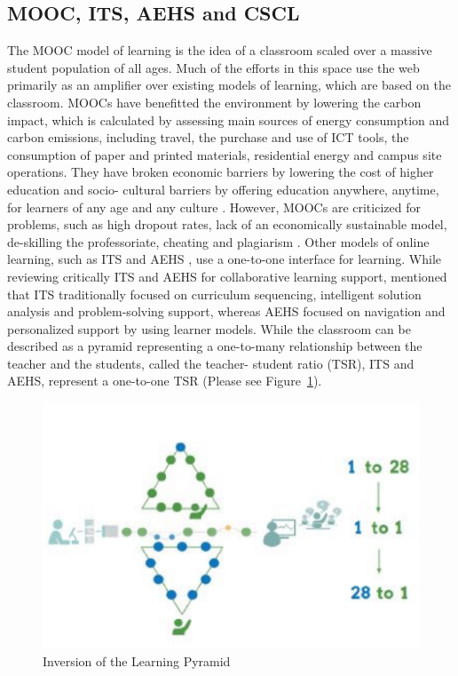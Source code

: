 \begin{multicols}{2}
\section{MOOC, ITS, AEHS and CSCL}

The MOOC model of learning is the idea of a classroom scaled over a massive student population of all ages. Much of the efforts in this space use the web primarily as an amplifier over existing models of learning, which are based on the classroom. MOOCs have benefitted the environment by lowering the carbon impact, which is calculated by assessing main sources of energy consumption and carbon emissions, including travel, the purchase and use of ICT tools, the consumption of paper and printed materials, residential energy and campus site operations. They have broken economic barriers by lowering the cost of higher education \cite{art2-key29} and socio- cultural barriers by offering education anywhere, anytime, for learners of any age and any culture \cite{art2-key25}. However, MOOCs are criticized for problems, such as high dropout rates, lack of an economically sustainable model, de-skilling the professoriate, cheating and plagiarism \cite{art2-key44}. Other models of online learning, such as ITS and AEHS \cite{art2-key05, art2-key10, art2-key18, art2-key39}, use a one-to-one interface for learning. While reviewing critically ITS and AEHS for collaborative learning support, \cite{art2-key35} mentioned that ITS traditionally focused on curriculum sequencing, intelligent solution analysis and problem-solving support, whereas AEHS focused on navigation and personalized support by using learner models. While the classroom can be described as a pyramid representing a one-to-many relationship between the teacher and the students, called the teacher- student ratio (TSR), ITS and AEHS, represent a one-to-one TSR (Please see Figure~\ref{chap2-fig02}).

\begin{figure}[H]
\centering
\includegraphics[scale=1.1]{src/Figures/chap2/chap2-fig02.jpg}
\caption{Inversion of the Learning Pyramid}\label{chap2-fig02}
\end{figure}


\end{multicols}
